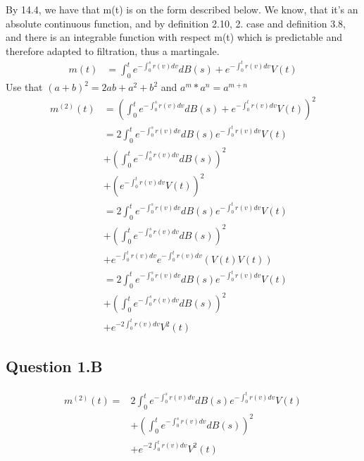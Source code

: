 \documentclass[10pt]{article}
\begin{document}
By 14.4, we have that m(t) is on the form described below.
We know, that it's an absolute continuous function, and by definition 2.10, 2. case and definition 3.8, and there is an integrable function with respect m(t) which is predictable and therefore adapted to filtration, thus a martingale.
\begin{equation}
\begin{split}
m(t) 	& = \int_0^t {e^{-\int_0^s {r(v) dv}}dB(s)  + e^{-\int_0^t {r(v) dv}}} V(t)
\end{split}
\end{equation}
Use that $(a+b)^2 = 2ab + a^2 + b^2$ and $a^m * a^n = a^{m+n}$
\begin{equation}
\begin{split}
m^{(2)}(t) & = (\int_0^t {e^{-\int_0^s {r(v) dv}}dB(s)  +  e^{-\int_0^t {r(v) dv}}} V(t))^2 \\
 		& =  2 \int_0^t {e^{-\int_0^s {r(v) dv}}dB(s) e^{-\int_0^t {r(v) dv}}} V(t) \\
& + (\int_0^t {e^{-\int_0^s {r(v) dv}}dB(s)})^2 \\
& + (e^{-\int_0^t {r(v) dv}} V(t))^2  \\
 		& = 2 \int_0^t {e^{-\int_0^s {r(v) dv}}dB(s) e^{-\int_0^t {r(v) dv}}} V(t) \\
& + (\int_0^t {e^{-\int_0^s {r(v) dv}}dB(s)})^2 \\
& + e^{-\int_0^t {r(v) dv}} e^{-\int_0^t {r(v) dv}} (V(t) V(t)) \\
 		& = 2 \int_0^t {e^{-\int_0^s {r(v) dv}}dB(s) e^{-\int_0^t {r(v) dv}}} V(t) \\
& + (\int_0^t {e^{-\int_0^s {r(v) dv}}dB(s)})^2 \\
& + e^{-2\int_0^t {r(v) dv}} V^2(t)
\end{split}
\end{equation}

\subsection{Question 1.B}
\begin{equation}
\begin{split}
m^{(2)}(t) =
& 2 \int_0^t {e^{-\int_0^s {r(v) dv}}dB(s) e^{-\int_0^t {r(v) dv}}} V(t) \\
& + (\int_0^t {e^{-\int_0^s {r(v) dv}}dB(s)})^2 \\
& + e^{-2\int_0^t {r(v) dv}} V^2(t)
\end{split}
\end{equation}
\end{document}
